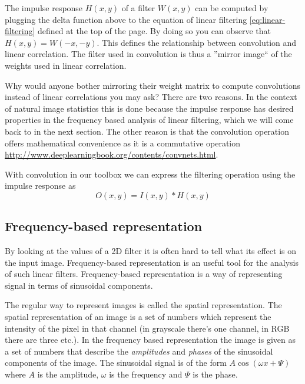 \documentclass[]{article}
\begin{document}
The impulse response $H(x,y)$ of a filter $W(x,y)$ can be computed by plugging
the delta function above to the equation of linear filtering
\ref{eq:linear-filtering} defined at the top of the page. By doing so you can
observe that $H(x,y) = W(-x,-y)$. This defines the relationship between
convolution and linear correlation. The filter used in convolution is thus a
''mirror image`` of the weights used in linear correlation.

Why would anyone bother mirroring their weight matrix to compute convolutions
instead of linear correlations you may ask? There are two reasons. In the
context of natural image statistics this is done because the impulse response
has desired properties in the frequency based analysis of linear filtering,
which we will come back to in the next section. The other reason is that the
convolution operation offers mathematical convenience as it is a commutative
operation \url{http://www.deeplearningbook.org/contents/convnets.html}.

With convolution in our toolbox we can express the filtering operation using
the impulse response as
\begin{equation}
  O(x,y) = I(x,y) \ast H(x,y)
\end{equation}

\subsection{Frequency-based representation}
\label{frequency-based-representation}
By looking at the values of a 2D filter it is often hard to tell what its
effect is on the input image. Frequency-based representation is an useful tool
for the analysis of such linear filters. Frequency-based representation is a
way of representing signal in terms of sinusoidal components.

The regular way to represent images is called the spatial representation. The
spatial representation of an image is a set of numbers which represent the
intensity of the pixel in that channel (in grayscale there's one channel, in
RGB there are three etc.). In the frequency based representation the image is
given as a set of numbers that describe the \textit{amplitudes} and
\textit{phases} of the sinusoidal components of the image. The sinusoidal
signal is of the form $A \cos(\omega x + \Psi)$ where $A$ is the amplitude,
$\omega$ is the frequency and $\Psi$ is the phase.
\end{document}
